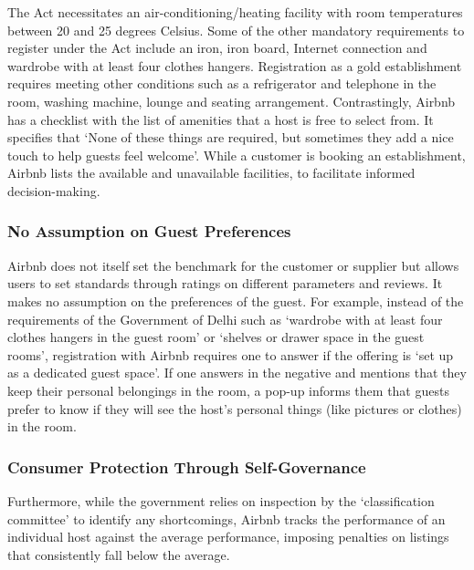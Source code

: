 \documentclass[a4paper, 12pt, twoside]{article}
\begin{document}
The Act necessitates an air-conditioning/heating facility with room temperatures between 20 and 25 degrees Celsius. Some of the other mandatory requirements to register under the Act include an iron, iron board, Internet connection and wardrobe with at least four clothes hangers. Registration as a gold establishment requires meeting other conditions such as a refrigerator and telephone in the room, washing machine, lounge and seating arrangement. Contrastingly, Airbnb has a checklist with the list of amenities that a host is free to select from. It specifies that ‘None of these things are required, but sometimes they add a nice touch to help guests feel welcome’. While a customer is booking an establishment, Airbnb lists the available and unavailable facilities, to facilitate informed decision-making.


                    \subsubsection{No Assumption on Guest Preferences}
                    Airbnb does not itself set the benchmark for the customer or supplier but allows users to set standards through ratings on different parameters and reviews. It makes no assumption on the preferences of the guest. For example, instead of the requirements of the Government of Delhi such as ‘wardrobe with at least four clothes hangers in the guest room’ or ‘shelves or drawer space in the guest rooms’, registration with Airbnb requires one to answer if the offering is ‘set up as a dedicated guest space’. If one answers in the negative and mentions that they keep their personal belongings in the room, a pop-up informs them that guests prefer to know if they will see the host’s personal things (like pictures or clothes) in the room.

               \subsubsection{Consumer Protection Through Self-Governance}
                   Furthermore, while the government relies on inspection by the ‘classification committee’ to identify any shortcomings, Airbnb tracks the performance of an individual host against the average performance, imposing penalties on listings that consistently fall below the average.\\
\end{document}
